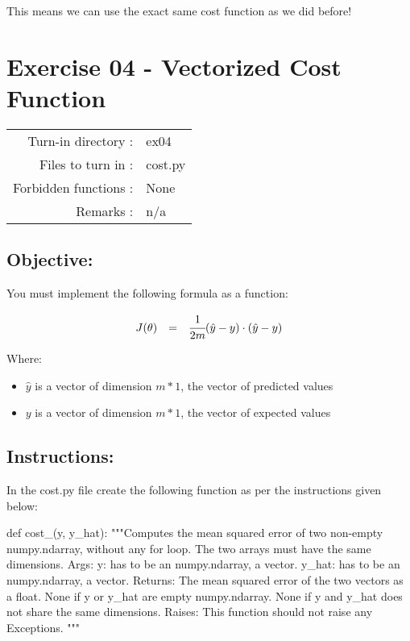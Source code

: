 \documentclass[]{article}
\newenvironment{Shaded}{\begin{snugshade}}{\end{snugshade}}
\newcommand{\CommentTok}[1]{\textcolor[rgb]{0.48,0.49,0.49}{#1}}
\newcommand{\KeywordTok}[1]{\textcolor[rgb]{0.81,0.81,0.76}{#1}}
\newcommand{\NormalTok}[1]{\textcolor[rgb]{0.81,0.81,0.76}{#1}}
\begin{document}
This means we can use the exact same cost function as we did before!
\clearpage

\hypertarget{exercise-04---vectorized-cost-function-1}{%
\section{Exercise 04 - Vectorized Cost
Function}\label{exercise-04---vectorized-cost-function-1}}

\begin{longtable}[]{@{}rl@{}}
\toprule
\endhead
Turn-in directory : & ex04\tabularnewline
Files to turn in : & cost.py\tabularnewline
Forbidden functions : & None\tabularnewline
Remarks : & n/a\tabularnewline
\bottomrule
\end{longtable}

\hypertarget{objective}{%
\subsection{Objective:}\label{objective}}

You must implement the following formula as a function:

\large

\[
\begin{matrix}
J(\theta) &  = & \cfrac{1}{2m}(\hat{y} - y) \cdot(\hat{y}- y)
\end{matrix}
\] \normalsize

Where:

\begin{itemize}
\item
  \(\hat{y}\) is a vector of dimension \(m * 1\), the vector of
  predicted values
\item
  \(y\) is a vector of dimension \(m * 1\), the vector of expected
  values
\end{itemize}

\hypertarget{instructions-3}{%
\subsection{Instructions:}\label{instructions-3}}

In the cost.py file create the following function as per the
instructions given below:

\begin{Shaded}
\begin{Highlighting}[]
\KeywordTok{def}\NormalTok{ cost_(y, y_hat):}
    \CommentTok{"""Computes the mean squared error of two non-empty numpy.ndarray, without any for loop. The two arrays must have the same dimensions.}
\CommentTok{    Args:}
\CommentTok{      y: has to be an numpy.ndarray, a vector.}
\CommentTok{      y_hat: has to be an numpy.ndarray, a vector.}
\CommentTok{    Returns:}
\CommentTok{      The mean squared error of the two vectors as a float.}
\CommentTok{      None if y or y_hat are empty numpy.ndarray.}
\CommentTok{      None if y and y_hat does not share the same dimensions.}
\CommentTok{    Raises:}
\CommentTok{      This function should not raise any Exceptions.}
\CommentTok{    """}
\end{Highlighting}
\end{Shaded}
\end{document}
